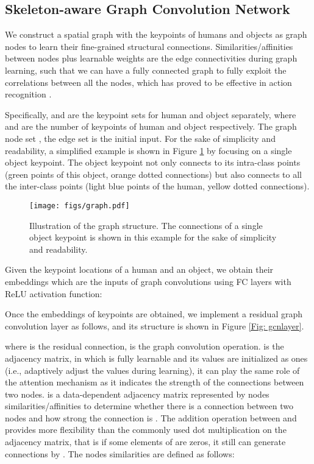 \documentclass[a4paper, 10pt, conference]{IEEEtran}
\begin{document}
\subsection{Skeleton-aware Graph Convolution Network}
\label{skeleton}
We construct a spatial graph  with the keypoints of humans and objects as graph nodes to learn their fine-grained structural connections. Similarities/affinities between nodes plus learnable weights are the edge connectivities during graph learning, such that we can have a fully connected graph to fully exploit the correlations between all the nodes, which has proved to be effective in action recognition \cite{AGCN,SGN}. 

Specifically,  and   are the keypoint sets for human and object separately, where  and  are the number of keypoints of human and object respectively. The graph node set , the edge set  is the initial input. For the sake of simplicity and readability, a simplified example is shown in Figure \ref{graph} by focusing on a single object keypoint. The object keypoint not only connects to its intra-class points (green points of this object, orange dotted connections) but also connects to all the inter-class points (light blue points of the human, yellow dotted connections). 


\begin{figure}[htbp]
	\setlength{\abovecaptionskip}{6pt} 
	\centering
	\texttt{[image: figs/graph.pdf]}
	\caption{\footnotesize{Illustration of the graph structure. The connections of a single object keypoint is shown in this example for the sake of simplicity and readability.}}
	\label{graph}
\end{figure}

Given the keypoint locations of a human and an object, 
we obtain their embeddings which are the inputs of graph convolutions using FC layers with ReLU activation function:


Once the embeddings of keypoints are obtained, we implement a residual graph convolution layer as follows, and its structure is shown in Figure \ref{Fig: gcnlayer}.

where  is the residual connection,  is the graph convolution operation.  is the adjacency matrix, in which  is fully learnable and its values are initialized as ones (i.e., adaptively adjust the values during learning), it can play the same role of the attention mechanism as it indicates the strength of the connections between two nodes.  is a data-dependent adjacency matrix represented by nodes similarities/affinities to determine whether there is a connection between two nodes and how strong the connection is \cite{AGCN}. The addition operation between  and  provides more flexibility than the commonly used dot multiplication on the adjacency matrix, that is if some elements of  are zeros, it still can generate connections by . The nodes similarities are defined as follows:
\end{document}
